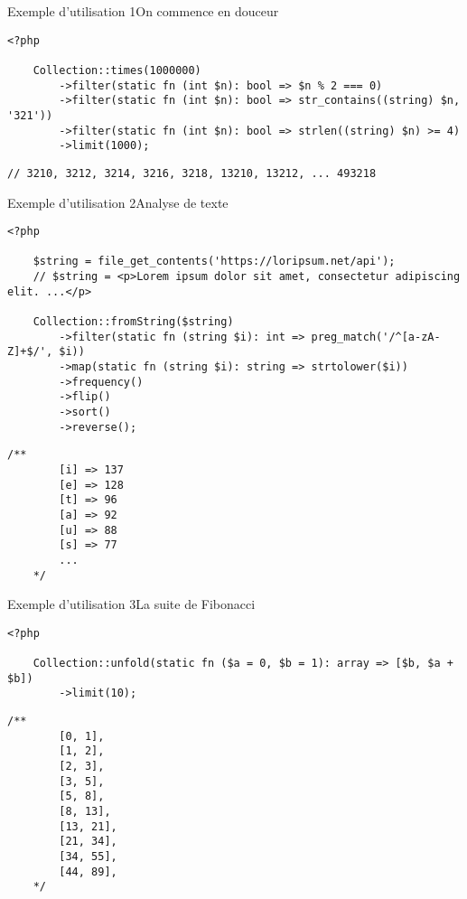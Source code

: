 \begin{frame}[fragile]{Exemple d'utilisation 1}{On commence en douceur}
    \begin{lstlisting}[firstnumber=1]
    <?php

    Collection::times(1000000)
        ->filter(static fn (int $n): bool => $n % 2 === 0)
        ->filter(static fn (int $n): bool => str_contains((string) $n, '321'))
        ->filter(static fn (int $n): bool => strlen((string) $n) >= 4)
        ->limit(1000);
    \end{lstlisting}

    \pause

    \begin{lstlisting}[firstnumber=9]
    // 3210, 3212, 3214, 3216, 3218, 13210, 13212, ... 493218
    \end{lstlisting}
\end{frame}

\begin{frame}[fragile]{Exemple d'utilisation 2}{Analyse de texte}
    \begin{lstlisting}[firstnumber=1]
    <?php

    $string = file_get_contents('https://loripsum.net/api');
    // $string = <p>Lorem ipsum dolor sit amet, consectetur adipiscing elit. ...</p>

    Collection::fromString($string)
        ->filter(static fn (string $i): int => preg_match('/^[a-zA-Z]+$/', $i))
        ->map(static fn (string $i): string => strtolower($i))
        ->frequency()
        ->flip()
        ->sort()
        ->reverse();
    \end{lstlisting}

    \pause

    \begin{lstlisting}[firstnumber=14]
    /**
        [i] => 137
        [e] => 128
        [t] => 96
        [a] => 92
        [u] => 88
        [s] => 77
        ...
    */
    \end{lstlisting}
\end{frame}

\begin{frame}[fragile]{Exemple d'utilisation 3}{La suite de Fibonacci}
    \begin{lstlisting}[firstnumber=1]
    <?php

    Collection::unfold(static fn ($a = 0, $b = 1): array => [$b, $a + $b])
        ->limit(10);
    \end{lstlisting}

    \pause

    \begin{lstlisting}[firstnumber=6]
    /**
        [0, 1],
        [1, 2],
        [2, 3],
        [3, 5],
        [5, 8],
        [8, 13],
        [13, 21],
        [21, 34],
        [34, 55],
        [44, 89],
    */
    \end{lstlisting}
\end{frame}

